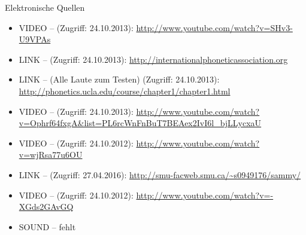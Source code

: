 \begin{frame}[allowframebreaks]{Elektronische Quellen}

	\footnotesize
	
	\begin{itemize}
	
		\item VIDEO --  (Zugriff: 24.10.2013): \url{http://www.youtube.com/watch?v=SHv3-U9VPAs}

		\item LINK --  (Zugriff: 24.10.2013): \url{http://internationalphoneticassociation.org}

		\item LINK --  (Alle Laute zum Testen) (Zugriff: 24.10.2013):\\ \url{http://phonetics.ucla.edu/course/chapter1/chapter1.html}
		\item VIDEO --  (Zugriff: 24.10.2013): \url{http://www.youtube.com/watch?v=Ophrf64fxgA&list=PL6rcWnFnBuT7BEAex2IvI6l_bjLLycxaU}

		\item VIDEO --  (Zugriff: 24.10.2012): \url{http://www.youtube.com/watch?v=wjRsa77u6OU}

		\item LINK --  (Zugriff: 27.04.2016): \url{http://smu-facweb.smu.ca/~s0949176/sammy/}

		\item VIDEO --  (Zugriff: 24.10.2012): \url{http://www.youtube.com/watch?v=-XGds2GAvGQ}
		
		\item SOUND --  fehlt
	\end{itemize}
	
\end{frame}


